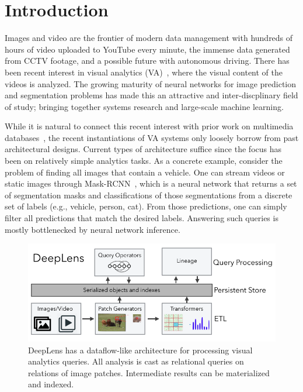 \section{Introduction}\label{intro}\sloppy
Images and video are the frontier of modern data management with hundreds of hours of video uploaded to YouTube every minute, the immense data generated from CCTV footage, and a possible future with autonomous driving. There has been recent interest in visual analytics (VA)~\cite{anderson2018predicate, kang2018blazeit,kang2017noscope, wu2018querying, sparks2017keystoneml}, where the visual content of the videos is analyzed.
The growing maturity of neural networks for image prediction and segmentation problems has made this an attractive and inter-discplinary field of study; bringing together systems research and large-scale machine learning.

While it is natural to connect this recent interest with prior work on multimedia databases~\cite{yoshitaka1999survey}, the recent instantiations of VA systems only loosely borrow from past architectural designs. Current types of architecture suffice since the focus has been on relatively simple analytics tasks. 
As a concrete example, consider the problem of finding all images that contain a vehicle.
One can stream videos or static images through  Mask-RCNN~\cite{he2017mask}, which is a neural network that returns a set of segmentation masks and classifications of those segmentations from a discrete set of labels (e.g., vehicle, person, cat). 
From those predictions, one can simply filter all predictions that match the desired labels.
Answering such queries is mostly bottlenecked by neural network inference.


\begin{figure}[t]
\centering
 \includegraphics[width=\columnwidth]{figures/teaser.png}
 \caption{DeepLens has a dataflow-like architecture for processing visual analytics queries. All analysis is cast as relational queries on relations of image patches. Intermediate results can be materialized and indexed.  \label{teaser} }
\end{figure}


